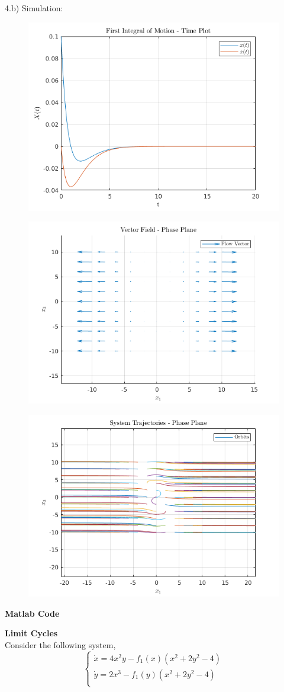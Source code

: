\documentclass{homeworg}
\begin{document}
4.b) Simulation:
\begin{figure}[h]
  \includegraphics[width=.6\textwidth]{fig01.png}
  \centering
\end{figure}
\begin{figure}[h]
  \includegraphics[width=.6\textwidth]{fig02.png}
  \centering
\end{figure}
\begin{figure}[h]
  \includegraphics[width=.6\textwidth]{fig03.png}
  \centering
\end{figure}

\newpage
\newpage
\newpage

\noindent
\textbf{Matlab Code}






\exercise
\noindent
\textbf{Limit Cycles}\\
Consider the following system,
\begin{equation*}
  \begin{cases}
    \dot{x} = 4 x^2 y - f_1 (x) \left( x^2 + 2 y^2 -4  \right)\\
    \dot{y} = 2 x^3 - f_1 (y) \left( x^2 + 2 y^2 -4  \right)\\
  \end{cases}
\end{equation*}
\end{document}
